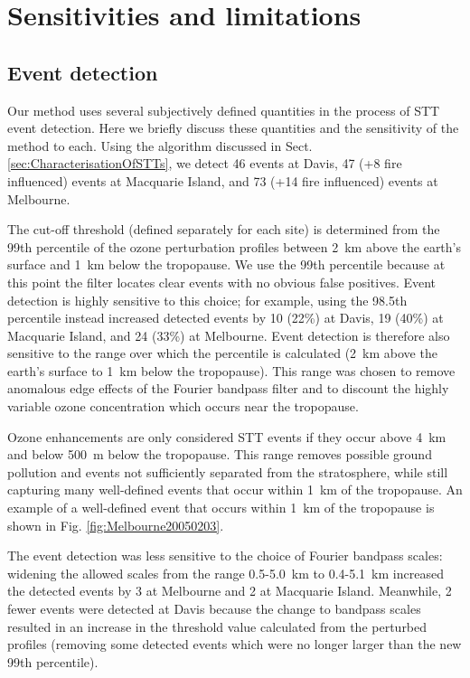 \documentclass[acp, manuscript]{copernicus} %
\begin{document}
\section{Sensitivities and limitations}
\label{sec:sensitivity}
  \subsection{Event detection}
    Our method uses several subjectively defined quantities in the process of STT event detection.
    Here we briefly discuss these quantities and the sensitivity of the method to each.
    Using the algorithm discussed in Sect. \ref{sec:CharacterisationOfSTTs}, we detect 46 events at Davis, 47 (+8 fire influenced) events at Macquarie Island, and 73 (+14 fire influenced) events at Melbourne.
    
    The cut-off threshold (defined separately for each site) is determined from the 99th percentile of the ozone perturbation profiles between 2~km above the earth's surface and 1~km below the tropopause.
    We use the 99th percentile because at this point the filter locates clear events with no obvious false positives.
    Event detection is highly sensitive to this choice; for example, using the 98.5th percentile instead increased detected events by 10 (22\%) at Davis, 19 (40\%) at Macquarie Island, and 24 (33\%) at Melbourne.
    Event detection is therefore also sensitive to the range over which the percentile is calculated (2~km above the earth's surface to 1~km below the tropopause).
    This range was chosen to remove anomalous edge effects of the Fourier bandpass filter and to discount the highly variable ozone concentration which occurs near the tropopause.
    
    Ozone enhancements are only considered STT events if they occur above 4~km and below 500~m below the tropopause.
    This range removes possible ground pollution and events not sufficiently separated from the stratosphere, while still capturing many well-defined events that occur within 1~km of the tropopause.
    An example of a well-defined event that occurs within 1~km of the tropopause is shown in Fig. \ref{fig:Melbourne20050203}.
    
    The event detection was less sensitive to the choice of Fourier bandpass scales: widening the allowed scales from the range 0.5-5.0~km to 0.4-5.1~km increased the detected events by 3 at Melbourne and 2 at Macquarie Island. Meanwhile, 2 fewer events were detected at Davis because the change to bandpass scales resulted in an increase in the threshold value calculated from the perturbed profiles (removing some detected events which were no longer larger than the new 99th percentile).
    
\end{document}
